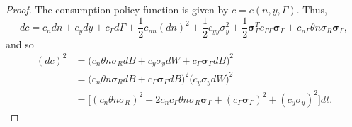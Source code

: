 \documentclass[11pt]{extarticle}
\theoremstyle{plain}
\theoremstyle{definition}
\begin{document}
\vspace{2mm}
\noindent
\begin{proof}
	
	The consumption policy function is given by $c = c(n, y, \Gamma)$. Thus, 
	\begin{equation*}
		dc = c_n dn + c_y dy + c_\Gamma d \Gamma  + \frac{1}{2} c_{nn} (dn)^2 + \frac{1}{2} c_{yy} \sigma_y^2 + \frac{1}{2} \bm \sigma_\Gamma^T c_{\Gamma \Gamma} \bm \sigma_\Gamma + c_{n \Gamma} \theta n \sigma_R \bm \sigma_\Gamma,
	\end{equation*}
	and so 
	\begin{align*}
		(dc)^2 &= \bigg( c_n \theta n \sigma_R dB + c_y \sigma_y dW + c_\Gamma \bm \sigma_\Gamma dB \bigg)^2 \\
		&= \bigg( c_n \theta n \sigma_R dB + c_\Gamma \bm \sigma_\Gamma dB \bigg)^2 \bigg( c_y \sigma_y dW \bigg)^2 \\
		&= \bigg[ (c_n \theta n \sigma_R)^2 + 2 c_n c_\Gamma \theta n \sigma_R \bm \sigma_\Gamma + (c_\Gamma \bm \sigma_\Gamma)^2 + (c_y \sigma_y)^2 \bigg] dt.
	\end{align*}
	
	
	
	
	

\end{proof}
\end{document}
